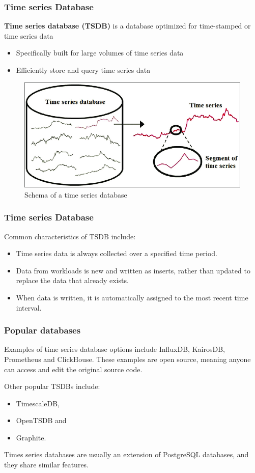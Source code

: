 \documentclass[compress]{beamer}
\begin{document}
\begin{frame}
\frametitle{Time series Database}
\textbf{Time series database (TSDB)} is a database optimized for time-stamped or time series data
\begin{itemize}
\item Specifically built for large volumes of time series data
\item Efficiently store and query time series data
\end{itemize}
\begin{figure}
\centering
\includegraphics[scale=0.25]{./images/TSDB.png}
\caption{Schema of a time series database}
\end{figure}
\end{frame}


\begin{frame}
\frametitle{Time series Database}
Common characteristics of TSDB include:
\begin{itemize}
\item Time series data is always collected over a specified time period.
\item Data from workloads is new and written as inserts, rather than updated to replace the data that already exists.
\item When data is written, it is automatically assigned to the most recent time interval.
\end{itemize}
\end{frame}


\begin{frame}
\frametitle{Popular databases}
Examples of time series database options include InfluxDB, KairosDB, Prometheus and ClickHouse. These examples are open source, meaning anyone can access and edit the original source code.

Other popular TSDBs include:

\begin{itemize}
\item TimescaleDB,
\item OpenTSDB and
\item Graphite.
\end{itemize}
Times series databases are usually an extension of PostgreSQL databases, and they share similar features.
\end{frame}
\end{document}
